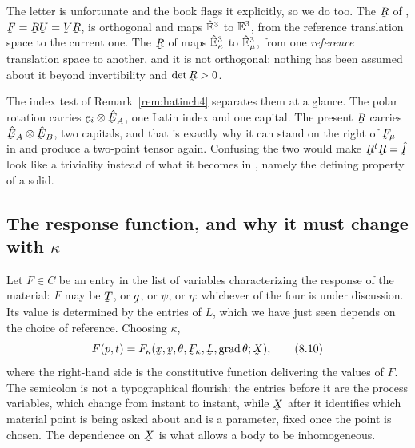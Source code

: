 \begin{remark}\label{rem:ch8Rwarning}
The letter is unfortunate and the book flags it explicitly, so we do
too. The $\bR$ of , $\bF=\bR\bU=\bV\bR$, is orthogonal and
maps $\hat{\mathbb{E}}^{3}$ to $\mathbb{E}^{3}$, from the reference translation space to the
current one. The $\bR$ of  maps $\hat{\mathbb{E}}^{3}_{\kappa}$ to
$\hat{\mathbb{E}}^{3}_{\mu}$, from one \emph{reference} translation space to another,
and it is not orthogonal: nothing has been assumed about it beyond
invertibility and $\det\bR>0$.

The index test of Remark~\ref{rem:hatinch4} separates them at a glance.
The polar rotation carries $\be_{i}\otimes\hbE_{A}$, one Latin index and
one capital. The present $\bR$ carries $\hbE_{A}\otimes\hbE_{B}$, two
capitals, and that is exactly why it can stand on the right of
$\bF_{\mu}$ in  and produce a two-point tensor again.
Confusing the two would make $\bR^{t}\bR=\hI$ look like a triviality
instead of what it becomes in , namely the defining property
of a solid.
\end{remark}

\subsection*{The response function, and why it must change with
$\kappa$}

Let $F\in C$ be an entry in the list of variables characterizing the
response of the material: $F$ may be $\bT$, or $\bq$, or $\psi$, or
$\eta$: whichever of the four is under discussion. Its value is
determined by the entries of $L$, which we have just seen depends on the
choice of reference. Choosing $\kappa$,
\begin{equation}
   F(p,t)=F_{\kappa}(\bx,\bv,\theta,\bF_{\kappa},\bL,\grad\theta;\bX),
   \tag{8.10}\label{eq:8.10}
\end{equation}
where the right-hand side is the constitutive function delivering the
values of $F$. The semicolon is not a typographical flourish: the
entries before it are the process variables, which change from instant
to instant, while $\bX$ after it identifies which material point is
being asked about and is a parameter, fixed once the point is chosen.
The dependence on $\bX$ is what allows a body to be inhomogeneous.

